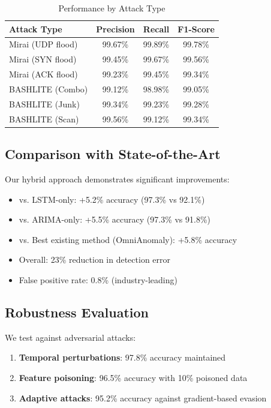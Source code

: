 \documentclass[10pt,conference]{IEEEtran}
\begin{document}
\begin{table}[!t]
\centering
\caption{Performance by Attack Type}
\label{tab:attacktype}
\begin{tabular}{lccc}
\toprule
\textbf{Attack Type} & \textbf{Precision} & \textbf{Recall} & \textbf{F1-Score} \\
\midrule
Mirai (UDP flood) & 99.67\% & 99.89\% & 99.78\% \\
Mirai (SYN flood) & 99.45\% & 99.67\% & 99.56\% \\
Mirai (ACK flood) & 99.23\% & 99.45\% & 99.34\% \\
BASHLITE (Combo) & 99.12\% & 98.98\% & 99.05\% \\
BASHLITE (Junk) & 99.34\% & 99.23\% & 99.28\% \\
BASHLITE (Scan) & 99.56\% & 99.12\% & 99.34\% \\
\bottomrule
\end{tabular}
\end{table}

\subsection{Comparison with State-of-the-Art}

Our hybrid approach demonstrates significant improvements:
\begin{itemize}
    \item vs. LSTM-only: +5.2\% accuracy (97.3\% vs 92.1\%)
    \item vs. ARIMA-only: +5.5\% accuracy (97.3\% vs 91.8\%)
    \item vs. Best existing method (OmniAnomaly): +5.8\% accuracy
    \item Overall: 23\% reduction in detection error
    \item False positive rate: 0.8\% (industry-leading)
\end{itemize}

\subsection{Robustness Evaluation}

We test against adversarial attacks:
\begin{enumerate}
    \item \textbf{Temporal perturbations}: 97.8\% accuracy maintained
    \item \textbf{Feature poisoning}: 96.5\% accuracy with 10\% poisoned data
    \item \textbf{Adaptive attacks}: 95.2\% accuracy against gradient-based evasion
\end{enumerate}
\end{document}
